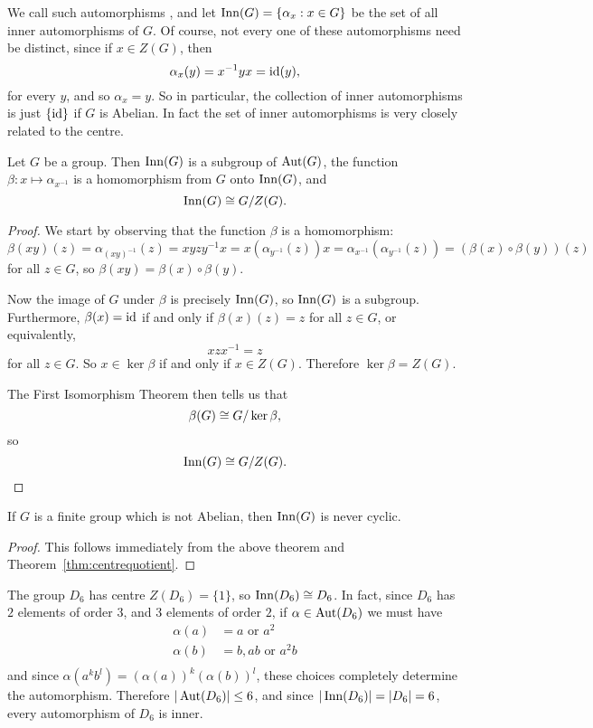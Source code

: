 We call such automorphisms , and
let $\operatorname{Inn}(G) = \{ \alpha_{x} : x \in G\}$ be the set of all inner automorphisms
of $G$.  Of course, not every one of these automorphisms need be distinct,
since if $x \in Z(G)$, then
\[
  \alpha_{x}(y) = x^{-1}yx = \text{id}(y),
\]
for every $y$, and so $\alpha_{x} = y$.  So in particular, the collection of
inner automorphisms is just $\{\text{id}\}$ if $G$ is Abelian.  In fact the set of
inner automorphisms is very closely related to the centre.

\begin{theorem}
  Let $G$ be a group.  Then $\operatorname{Inn}(G)$ is a subgroup of $\operatorname{Aut}(G)$, the function
  $\beta: x \mapsto \alpha_{x^{-1}}$ is a homomorphism from $G$ onto $\operatorname{Inn}(G)$, and
  \[
    \operatorname{Inn}(G) \cong G/Z(G).
  \]
\end{theorem}
\begin{proof}
  We start by observing that the function $\beta$ is a homomorphism:
  \[
    \beta(xy)(z) = \alpha_{(xy)^{-1}}(z) = xyzy^{-1}x = x(\alpha_{y^{-1}}(z))x
    = \alpha_{x^{-1}}(\alpha_{y^{-1}}(z)) = (\beta(x) \circ \beta(y))(z)
  \]
  for all $z \in G$, so $\beta(xy) = \beta(x) \circ \beta(y)$.
  
  Now the image of $G$ under $\beta$ is precisely $\operatorname{Inn}(G)$, so $\operatorname{Inn}(G)$ is
  a subgroup.  Furthermore, $\beta(x) = \text{id}$ if and only if
  $\beta(x)(z) = z$ for all $z \in G$, or equivalently,
  \[
    xzx^{-1} = z
  \]
  for all $z \in G$.  So $x \in \ker \beta$ if and only if $x \in Z(G)$.
  Therefore $\ker \beta = Z(G)$.
  
  The First Isomorphism Theorem then tells us that
  \[
    \beta(G) \cong G/\ker \beta,
  \]
  so
  \[
    \operatorname{Inn}(G) \cong G/Z(G).
  \]
\end{proof}
\begin{corollary}
  If $G$ is a finite group which is not Abelian, then $\operatorname{Inn}(G)$ is never
  cyclic.
\end{corollary}
\begin{proof}
  This follows immediately from the above theorem and
  Theorem~\ref{thm:centrequotient}.
\end{proof}

\begin{example}
  The group $D_{6}$ has centre $Z(D_{6}) = \{1\}$, so $\operatorname{Inn}(D_{6}) \cong D_{6}$.
  In fact, since $D_{6}$ has $2$ elements of order $3$, and $3$ elements of
  order $2$, if $\alpha \in \operatorname{Aut}(D_{6})$ we must have
  \begin{align*}
    \alpha(a) &= a \text{ or } a^{2}\\
    \alpha(b) &= b, ab \text{ or } a^{2}b\\
  \end{align*}
  and since $\alpha(a^{k}b^{l}) = (\alpha(a))^{k}(\alpha(b))^{l}$, these
  choices completely determine the automorphism.  Therefore $|\operatorname{Aut}(D_{6})|
  \le 6$, and since $|\operatorname{Inn}(D_{6})| = |D_{6}| = 6$, every automorphism of
  $D_{6}$ is inner.
\end{example}

